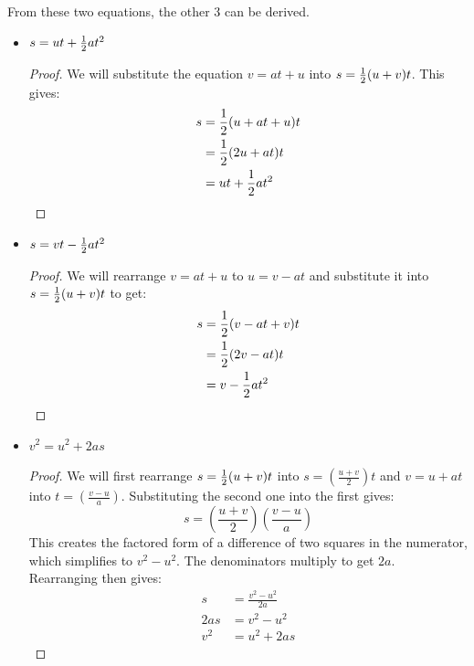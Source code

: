     From these two equations, the other 3 can be derived.
    \begin{itemize}
        \item $s=ut+\frac{1}{2} at^2$
        \begin{proof}
            We will substitute the equation $v=at+u$ into $s=\frac{1}{2}(u+v)t$.
            This gives:
            \begin{equation*}
                \begin{aligned}
                    s&=\frac{1}{2}(u+at+u)t \\
                    &=\frac{1}{2}(2u+at)t \\
                    &=ut+\frac{1}{2} at^2
                \end{aligned}
            \end{equation*}
        \end{proof}
        \item $s=vt-\frac{1}{2} at^2$
        \begin{proof}
            We will rearrange $v=at+u$ to $u=v-at$ and substitute it into $s=\frac{1}{2}(u+v)t$ to get:
            \begin{equation*}
                \begin{aligned}
                    s&=\frac{1}{2}(v-at+v)t \\
                    &=\frac{1}{2}(2v-at)t \\
                    &=v-\frac{1}{2} at^2
                \end{aligned}
            \end{equation*}
        \end{proof}
        \item $v^2=u^2+2as$
        \begin{proof}
            We will first rearrange $s=\frac{1}{2}(u+v)t$ into $s=\left(\frac{u+v}{2}\right)t$ and $v=u+at$ into $t=\left(\frac{v-u}{a}\right)$.
            Substituting the second one into the first gives:
            \begin{equation}
                s=\left(\frac{u+v}{2}\right)\left(\frac{v-u}{a}\right)
            \end{equation}
            This creates the factored form of a difference of two squares in the numerator, which simplifies to $v^2-u^2$.
            The denominators multiply to get $2a$.
            Rearranging then gives:
            \begin{equation*}
                \begin{aligned}
                    s&=\frac{v^2-u^2}{2a} \\
                    2as&=v^2-u^2 \\
                    v^2&=u^2+2as
                \end{aligned}
            \end{equation*}
        \end{proof}
    \end{itemize}

